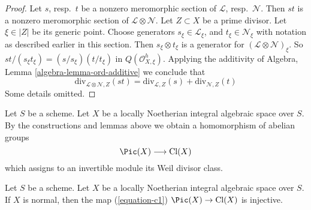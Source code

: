 \begin{proof}
Let $s$, resp.\ $t$ be a nonzero meromorphic section
of $\mathcal{L}$, resp.\ $\mathcal{N}$. Then $st$ is a nonzero
meromorphic section of $\mathcal{L} \otimes \mathcal{N}$.
Let $Z \subset X$ be a prime divisor. Let $\xi \in |Z|$ be its generic
point. Choose generators $s_\xi \in \mathcal{L}_\xi$, and
$t_\xi \in \mathcal{N}_\xi$ with notation as described earlier
in this section. Then $s_\xi \otimes t_\xi$ is a generator
for $(\mathcal{L} \otimes \mathcal{N})_\xi$.
So $st/(s_\xi t_\xi) = (s/s_\xi)(t/t_\xi)$ in
$Q(\mathcal{O}_{X, \xi}^h)$. Applying the additivity of
Algebra, Lemma \ref{algebra-lemma-ord-additive}
we conclude that
$$
\text{div}_{\mathcal{L} \otimes \mathcal{N}, Z}(st)
=
\text{div}_{\mathcal{L}, Z}(s) + \text{div}_{\mathcal{N}, Z}(t)
$$
Some details omitted.
\end{proof}

\noindent
Let $S$ be a scheme. Let $X$ be a locally Noetherian integral algebraic space
over $S$. By the constructions and lemmas above we obtain a homomorphism
of abelian groups
\begin{equation}
\label{equation-c1}
\Pic(X) \longrightarrow \text{Cl}(X)
\end{equation}
which assigns to an invertible module its Weil divisor class.

\begin{lemma}
\label{lemma-normal-c1-injective}
Let $S$ be a scheme. Let $X$ be a locally Noetherian integral algebraic space
over $S$. If $X$ is normal, then the map (\ref{equation-c1})
$\Pic(X) \to \text{Cl}(X)$ is injective.
\end{lemma}

